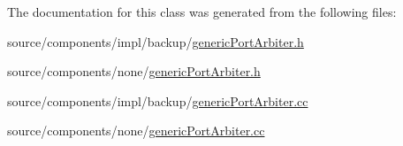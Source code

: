 The documentation for this class was generated from the following files:\begin{CompactItemize}
\item 
source/components/impl/backup/\hyperlink{impl_2backup_2genericPortArbiter_8h}{genericPortArbiter.h}\item 
source/components/none/\hyperlink{none_2genericPortArbiter_8h}{genericPortArbiter.h}\item 
source/components/impl/backup/\hyperlink{impl_2backup_2genericPortArbiter_8cc}{genericPortArbiter.cc}\item 
source/components/none/\hyperlink{none_2genericPortArbiter_8cc}{genericPortArbiter.cc}\end{CompactItemize}
